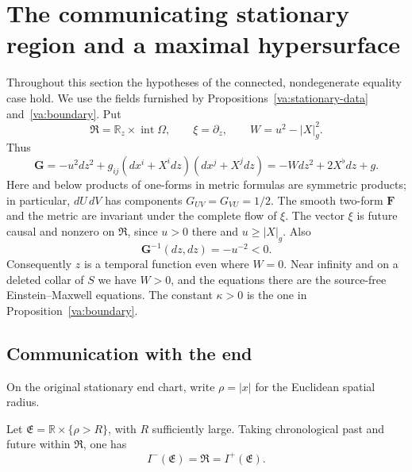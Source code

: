 \section{The communicating stationary region and a maximal hypersurface}
\label{st:section}

Throughout this section the hypotheses of the connected, nondegenerate
equality case hold.  We use the fields furnished by
Propositions~\ref{va:stationary-data} and~\ref{va:boundary}.  Put
\[
 \mathfrak R=\mathbb R_z\times\operatorname{int}\Omega,
 \qquad \xi=\partial_z,
 \qquad W=u^2-|X|_g^2.
\]
Thus
\begin{equation}\label{st:product}
 \mathbf G=-u^2dz^2+g_{ij}(dx^i+X^i dz)(dx^j+X^j dz)
          =-Wdz^2+2X^\flat dz+g.
\end{equation}
Here and below products of one-forms in metric formulas are symmetric
products; in particular, $dU\,dV$ has components
$G_{UV}=G_{VU}=1/2$.  The smooth two-form $\mathbf F$ and the metric
are invariant under the complete flow of $\xi$.  The vector $\xi$ is
future causal and nonzero on $\mathfrak R$, since $u>0$ there and
$u\geq |X|_g$.  Also
\begin{equation}\label{st:original-time}
 \mathbf G^{-1}(dz,dz)=-u^{-2}<0.
\end{equation}
Consequently $z$ is a temporal function even where $W=0$.  Near infinity
and on a deleted collar of $S$ we have $W>0$, and the equations there
are the source-free Einstein--Maxwell equations.  The constant
$\kappa>0$ is the one in Proposition~\ref{va:boundary}.

\subsection{Communication with the end}

On the original stationary end chart, write $\rho=|x|$ for the
Euclidean spatial radius.

\begin{proposition}\label{st:communication}
Let $\mathfrak E=\mathbb R\times\{\rho>R\}$, with $R$ sufficiently
large.  Taking chronological past and future within $\mathfrak R$, one has
\[
 I^-(\mathfrak E)=\mathfrak R=I^+(\mathfrak E).
\]
\end{proposition}

